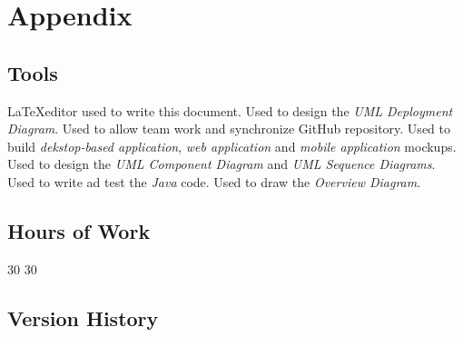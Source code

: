 \section{Appendix}
\subsection{Tools}
\begin{itemize}
	 \LaTeX editor used to write this document.
	 Used to design the \textit{UML Deployment Diagram}.
	 Used to allow team work and synchronize GitHub repository.
	 Used to build \textit{dekstop-based application}, \textit{web application} and \textit{mobile application} mockups.
	 Used to design the \textit{UML Component Diagram} and \textit{UML Sequence Diagrams}.
	 Used to write ad test the \textit{Java} code.
	 Used to draw the \textit{Overview Diagram}.
\end{itemize}
\subsection{Hours of Work}
\begin{itemize}
	 30
	 30
\end{itemize}
\subsection{Version History}
